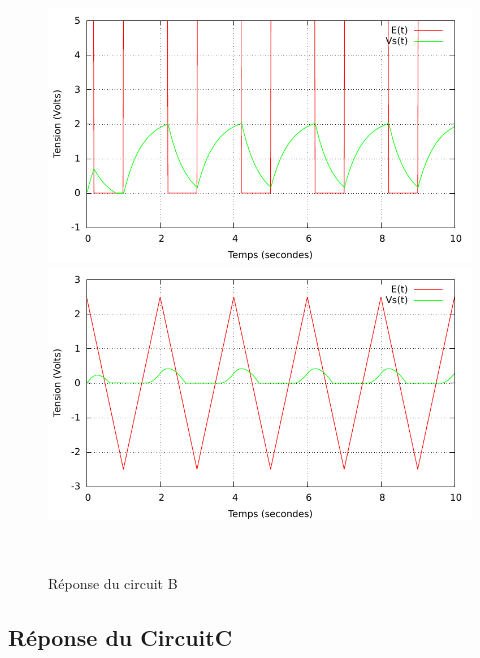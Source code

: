 \documentclass[a4paper,11pt]{article}
\begin{document}
\begin{figure}[h!]
\begin{minipage}[b]{0.5\linewidth}
      \centering \includegraphics[scale=.68]{CBcarre.pdf}
   \end{minipage}
  \begin{minipage}[b]{0.5\linewidth}   
      \centering \includegraphics[scale=.68]{CBtriangle.pdf}
   \end{minipage}\\
 \caption{ Réponse du circuit B}
\end{figure}
\newpage
  \subsection{Réponse du CircuitC}
\end{document}
